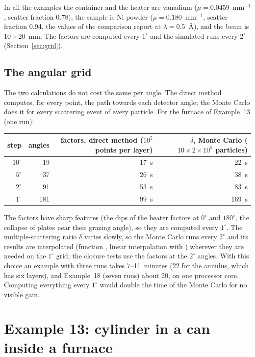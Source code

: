 In all the examples the container and the heater are vanadium ($\mu = 0.0459$~mm$^{-1}$, scatter fraction 0.78), the sample is Ni powder
($\mu = 0.180$~mm$^{-1}$, scatter fraction 0.94, the values of the comparison report at $\lambda = 0.5$~\AA), and the beam is
$10\times20$~mm. The factors are computed every $1^\circ$ and the simulated runs every $2^\circ$ (Section~\ref{sec:grid}).

\subsection*{The angular grid}
\label{sec:grid}
The two calculations do not cost the same per angle. The direct method computes, for every point, the path towards each detector
angle; the Monte Carlo does it for every scattering event of every particle. For the furnace of Example~13 (one run):
\begin{center}\small
\begin{tabular}{@{}rrrr@{}}
  \toprule \textbf{step} & \textbf{angles} & \textbf{factors, direct method ($10^5$ points per layer)} & \textbf{$\delta$, Monte Carlo ($10\times2\times10^5$ particles)} \\ \midrule
  $10^\circ$ & 19 & 17~s & 22~s \\
  $5^\circ$ & 37 & 26~s & 38~s \\
  $2^\circ$ & 91 & 53~s & 83~s \\
  $1^\circ$ & 181 & 99~s & 169~s \\ \bottomrule
\end{tabular}
\end{center}
The factors have sharp features (the dips of the heater factors at $0^\circ$ and $180^\circ$, the collapse of plates near their grazing
angle), so they are computed every $1^\circ$. The multiple-scattering ratio $\delta$ varies slowly, so the Monte Carlo runs every $2^\circ$
and its results are interpolated (function , linear interpolation with ) wherever they are needed on
the $1^\circ$ grid; the closure tests use the factors at the $2^\circ$ angles. With this choice an example with three runs takes 7--11~minutes
(22 for the annulus, which has six layers), and Example~18 (seven runs) about 20, on one processor core. Computing everything every $1^\circ$ would double the time
of the Monte Carlo for no visible gain.

\section{Example 13: cylinder in a can inside a furnace}

